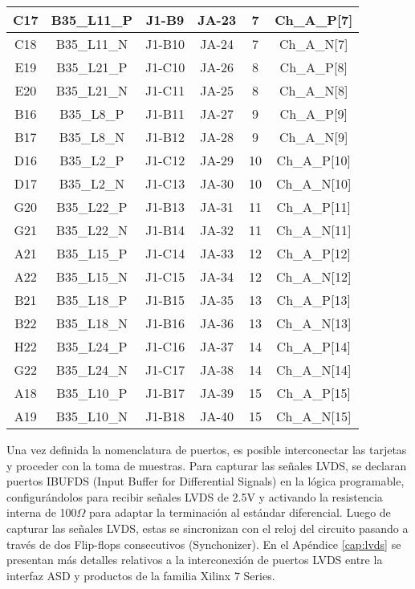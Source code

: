 \begin{table}[]
{\begin{tabular}{|c|c|c|c|c|c|}
				\rowcolor[HTML]{D9E1F2} 
				C17 & B35\_L11\_P & J1-B9  & JA-23 & 7  & Ch\_A\_P{[}7{]}  \\ \hline
				C18 & B35\_L11\_N & J1-B10 & JA-24 & 7  & Ch\_A\_N{[}7{]}  \\ \hline
				\rowcolor[HTML]{D9E1F2} 
				E19 & B35\_L21\_P & J1-C10 & JA-26 & 8  & Ch\_A\_P{[}8{]}  \\ \hline
				E20 & B35\_L21\_N & J1-C11 & JA-25 & 8  & Ch\_A\_N{[}8{]}  \\ \hline
				\rowcolor[HTML]{D9E1F2} 
				B16 & B35\_L8\_P  & J1-B11 & JA-27 & 9  & Ch\_A\_P{[}9{]}  \\ \hline
				B17 & B35\_L8\_N  & J1-B12 & JA-28 & 9  & Ch\_A\_N{[}9{]}  \\ \hline
				\rowcolor[HTML]{D9E1F2} 
				D16 & B35\_L2\_P  & J1-C12 & JA-29 & 10 & Ch\_A\_P{[}10{]} \\ \hline
				D17 & B35\_L2\_N  & J1-C13 & JA-30 & 10 & Ch\_A\_N{[}10{]} \\ \hline
				\rowcolor[HTML]{D9E1F2} 
				G20 & B35\_L22\_P & J1-B13 & JA-31 & 11 & Ch\_A\_P{[}11{]} \\ \hline
				G21 & B35\_L22\_N & J1-B14 & JA-32 & 11 & Ch\_A\_N{[}11{]} \\ \hline
				\rowcolor[HTML]{D9E1F2} 
				A21 & B35\_L15\_P & J1-C14 & JA-33 & 12 & Ch\_A\_P{[}12{]} \\ \hline
				A22 & B35\_L15\_N & J1-C15 & JA-34 & 12 & Ch\_A\_N{[}12{]} \\ \hline
				\rowcolor[HTML]{D9E1F2} 
				B21 & B35\_L18\_P & J1-B15 & JA-35 & 13 & Ch\_A\_P{[}13{]} \\ \hline
				B22 & B35\_L18\_N & J1-B16 & JA-36 & 13 & Ch\_A\_N{[}13{]} \\ \hline
				\rowcolor[HTML]{D9E1F2} 
				H22 & B35\_L24\_P & J1-C16 & JA-37 & 14 & Ch\_A\_P{[}14{]} \\ \hline
				G22 & B35\_L24\_N & J1-C17 & JA-38 & 14 & Ch\_A\_N{[}14{]} \\ \hline
				\rowcolor[HTML]{D9E1F2} 
				A18 & B35\_L10\_P & J1-B17 & JA-39 & 15 & Ch\_A\_P{[}15{]} \\ \hline
				A19 & B35\_L10\_N & J1-B18 & JA-40 & 15 & Ch\_A\_N{[}15{]} \\ \hline
			\end{tabular}%
		}
		\label{tab:zynq-asd}
	\end{table}
	
	Una vez definida la nomenclatura de puertos, es posible interconectar las tarjetas y proceder con la toma de muestras. Para capturar las señales LVDS, se declaran puertos IBUFDS (Input Buffer for Differential Signals) \cite{Xilinx2012XilinxDesigns} en la lógica programable, configurándolos para recibir señales LVDS de 2.5V y activando la resistencia interna de 100$\Omega$ para adaptar la terminación al estándar diferencial. Luego de capturar las señales LVDS, estas se sincronizan con el reloj del circuito pasando a través de dos Flip-flops consecutivos (Synchonizer). En el Apéndice \ref{cap:lvds} se presentan más detalles relativos a la interconexión de puertos LVDS entre la interfaz ASD y productos de la familia Xilinx 7 Series.
	
